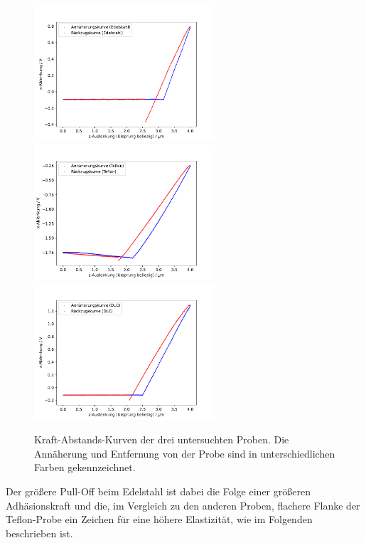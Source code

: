         \begin{figure}
            \centering
            \includegraphics[width = 0.60\textwidth]{pictures/Edelstahl.pdf}
            \includegraphics[width = 0.60\textwidth]{pictures/Teflon.pdf}
            \includegraphics[width = 0.60\textwidth]{pictures/DLC.pdf}
            \caption{Kraft-Abstands-Kurven der drei untersuchten Proben. Die Annäherung und Entfernung von der Probe sind in unterschiedlichen Farben gekennzeichnet.}
            \label{fig:KA}    
        \end{figure}
        Der größere Pull-Off beim Edelstahl ist dabei die Folge einer größeren Adhäsionskraft und die, im Vergleich zu den anderen Proben, flachere Flanke der Teflon-Probe ein Zeichen für eine höhere Elastizität, wie im Folgenden beschrieben ist.


